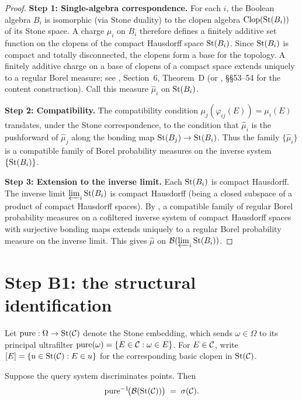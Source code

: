 \begin{proof}
\textbf{Step 1: Single-algebra correspondence.}
For each $i$, the Boolean algebra $B_i$ is isomorphic (via Stone duality) to the
clopen algebra $\mathrm{Clop}(\mathrm{St}(B_i))$ of its Stone space.  A charge $\mu_i$ on $B_i$
therefore defines a finitely additive set function on the clopens of the compact
Hausdorff space $\mathrm{St}(B_i)$.  Since $\mathrm{St}(B_i)$ is compact and totally disconnected,
the clopens form a base for the topology.  A finitely additive charge on a base of
clopens of a compact space extends uniquely to a regular Borel measure; see
\cite{cardona2025}, Section~6, Theorem~D (or \cite{halmos1950}, \S\S53--54 for
the content construction).  Call this measure $\hat{\mu}_i$ on $\mathrm{St}(B_i)$.

\textbf{Step 2: Compatibility.}
The compatibility condition $\mu_j(\varphi_{ij}(E)) = \mu_i(E)$ translates, under the
Stone correspondence, to the condition that $\hat{\mu}_i$ is the pushforward of
$\hat{\mu}_j$ along the bonding map $\mathrm{St}(B_j) \to \mathrm{St}(B_i)$.  Thus the family
$\{\hat{\mu}_i\}$ is a compatible family of Borel probability measures on the inverse
system $\{\mathrm{St}(B_i)\}$.

\textbf{Step 3: Extension to the inverse limit.}
Each $\mathrm{St}(B_i)$ is compact Hausdorff.  The inverse limit $\varprojlim_i \mathrm{St}(B_i)$ is
compact Hausdorff (being a closed subspace of a product of compact Hausdorff spaces).
By \cite[Theorem~1]{choksi1958}, a compatible family of regular Borel probability
measures on a cofiltered inverse system of compact Hausdorff spaces with surjective
bonding maps extends uniquely to a regular Borel probability measure on the inverse
limit.  This gives $\hat{\mu}$ on $\mathcal{B}(\varprojlim_i \mathrm{St}(B_i))$.
\end{proof}

\section{Step B1: the structural identification}
\label{sec:B1}

Let $\mathrm{pure} : \Omega \to \mathrm{St}(\mathcal{C})$ denote the Stone embedding, which sends
$\omega \in \Omega$ to its principal ultrafilter $\mathrm{pure}(\omega) = \{E \in \mathcal{C} :
\omega \in E\}$.  For $E \in \mathcal{C}$, write $[E] = \{u \in \mathrm{St}(\mathcal{C}) : E \in u\}$
for the corresponding basic clopen in $\mathrm{St}(\mathcal{C})$.

\begin{proposition}
\label{prop:B1}
Suppose the query system discriminates points.  Then
\[
  \mathrm{pure}^{-1}\!\bigl(\mathcal{B}(\mathrm{St}(\mathcal{C}))\bigr) \;=\; \sigma(\mathcal{C}).
\]
\end{proposition}

